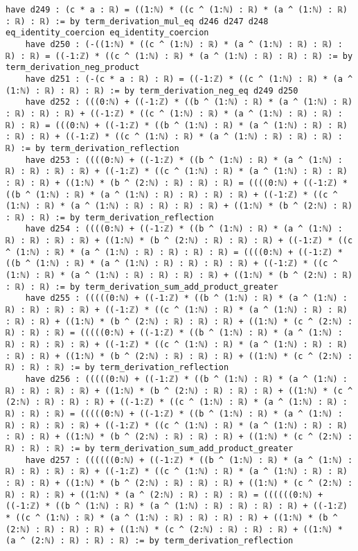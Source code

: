 \documentclass{article}
\begin{document}
\begin{tcolorbox}[colback=white!10, width=\linewidth]
\begin{lstlisting}[language=Lean4]
    have d249 : (c * a : ℝ) = ((1:ℕ) * ((c ^ (1:ℕ) : ℝ) * (a ^ (1:ℕ) : ℝ) : ℝ) : ℝ) := by term_derivation_mul_eq d246 d247 d248 eq_identity_coercion eq_identity_coercion
    have d250 : (-((1:ℕ) * ((c ^ (1:ℕ) : ℝ) * (a ^ (1:ℕ) : ℝ) : ℝ) : ℝ) : ℝ) = ((-1:ℤ) * ((c ^ (1:ℕ) : ℝ) * (a ^ (1:ℕ) : ℝ) : ℝ) : ℝ) := by term_derivation_neg_product
    have d251 : (-(c * a : ℝ) : ℝ) = ((-1:ℤ) * ((c ^ (1:ℕ) : ℝ) * (a ^ (1:ℕ) : ℝ) : ℝ) : ℝ) := by term_derivation_neg_eq d249 d250
    have d252 : (((0:ℕ) + ((-1:ℤ) * ((b ^ (1:ℕ) : ℝ) * (a ^ (1:ℕ) : ℝ) : ℝ) : ℝ) : ℝ) + ((-1:ℤ) * ((c ^ (1:ℕ) : ℝ) * (a ^ (1:ℕ) : ℝ) : ℝ) : ℝ) : ℝ) = (((0:ℕ) + ((-1:ℤ) * ((b ^ (1:ℕ) : ℝ) * (a ^ (1:ℕ) : ℝ) : ℝ) : ℝ) : ℝ) + ((-1:ℤ) * ((c ^ (1:ℕ) : ℝ) * (a ^ (1:ℕ) : ℝ) : ℝ) : ℝ) : ℝ) := by term_derivation_reflection
    have d253 : ((((0:ℕ) + ((-1:ℤ) * ((b ^ (1:ℕ) : ℝ) * (a ^ (1:ℕ) : ℝ) : ℝ) : ℝ) : ℝ) + ((-1:ℤ) * ((c ^ (1:ℕ) : ℝ) * (a ^ (1:ℕ) : ℝ) : ℝ) : ℝ) : ℝ) + ((1:ℕ) * (b ^ (2:ℕ) : ℝ) : ℝ) : ℝ) = ((((0:ℕ) + ((-1:ℤ) * ((b ^ (1:ℕ) : ℝ) * (a ^ (1:ℕ) : ℝ) : ℝ) : ℝ) : ℝ) + ((-1:ℤ) * ((c ^ (1:ℕ) : ℝ) * (a ^ (1:ℕ) : ℝ) : ℝ) : ℝ) : ℝ) + ((1:ℕ) * (b ^ (2:ℕ) : ℝ) : ℝ) : ℝ) := by term_derivation_reflection
    have d254 : ((((0:ℕ) + ((-1:ℤ) * ((b ^ (1:ℕ) : ℝ) * (a ^ (1:ℕ) : ℝ) : ℝ) : ℝ) : ℝ) + ((1:ℕ) * (b ^ (2:ℕ) : ℝ) : ℝ) : ℝ) + ((-1:ℤ) * ((c ^ (1:ℕ) : ℝ) * (a ^ (1:ℕ) : ℝ) : ℝ) : ℝ) : ℝ) = ((((0:ℕ) + ((-1:ℤ) * ((b ^ (1:ℕ) : ℝ) * (a ^ (1:ℕ) : ℝ) : ℝ) : ℝ) : ℝ) + ((-1:ℤ) * ((c ^ (1:ℕ) : ℝ) * (a ^ (1:ℕ) : ℝ) : ℝ) : ℝ) : ℝ) + ((1:ℕ) * (b ^ (2:ℕ) : ℝ) : ℝ) : ℝ) := by term_derivation_sum_add_product_greater
    have d255 : (((((0:ℕ) + ((-1:ℤ) * ((b ^ (1:ℕ) : ℝ) * (a ^ (1:ℕ) : ℝ) : ℝ) : ℝ) : ℝ) + ((-1:ℤ) * ((c ^ (1:ℕ) : ℝ) * (a ^ (1:ℕ) : ℝ) : ℝ) : ℝ) : ℝ) + ((1:ℕ) * (b ^ (2:ℕ) : ℝ) : ℝ) : ℝ) + ((1:ℕ) * (c ^ (2:ℕ) : ℝ) : ℝ) : ℝ) = (((((0:ℕ) + ((-1:ℤ) * ((b ^ (1:ℕ) : ℝ) * (a ^ (1:ℕ) : ℝ) : ℝ) : ℝ) : ℝ) + ((-1:ℤ) * ((c ^ (1:ℕ) : ℝ) * (a ^ (1:ℕ) : ℝ) : ℝ) : ℝ) : ℝ) + ((1:ℕ) * (b ^ (2:ℕ) : ℝ) : ℝ) : ℝ) + ((1:ℕ) * (c ^ (2:ℕ) : ℝ) : ℝ) : ℝ) := by term_derivation_reflection
    have d256 : (((((0:ℕ) + ((-1:ℤ) * ((b ^ (1:ℕ) : ℝ) * (a ^ (1:ℕ) : ℝ) : ℝ) : ℝ) : ℝ) + ((1:ℕ) * (b ^ (2:ℕ) : ℝ) : ℝ) : ℝ) + ((1:ℕ) * (c ^ (2:ℕ) : ℝ) : ℝ) : ℝ) + ((-1:ℤ) * ((c ^ (1:ℕ) : ℝ) * (a ^ (1:ℕ) : ℝ) : ℝ) : ℝ) : ℝ) = (((((0:ℕ) + ((-1:ℤ) * ((b ^ (1:ℕ) : ℝ) * (a ^ (1:ℕ) : ℝ) : ℝ) : ℝ) : ℝ) + ((-1:ℤ) * ((c ^ (1:ℕ) : ℝ) * (a ^ (1:ℕ) : ℝ) : ℝ) : ℝ) : ℝ) + ((1:ℕ) * (b ^ (2:ℕ) : ℝ) : ℝ) : ℝ) + ((1:ℕ) * (c ^ (2:ℕ) : ℝ) : ℝ) : ℝ) := by term_derivation_sum_add_product_greater
    have d257 : ((((((0:ℕ) + ((-1:ℤ) * ((b ^ (1:ℕ) : ℝ) * (a ^ (1:ℕ) : ℝ) : ℝ) : ℝ) : ℝ) + ((-1:ℤ) * ((c ^ (1:ℕ) : ℝ) * (a ^ (1:ℕ) : ℝ) : ℝ) : ℝ) : ℝ) + ((1:ℕ) * (b ^ (2:ℕ) : ℝ) : ℝ) : ℝ) + ((1:ℕ) * (c ^ (2:ℕ) : ℝ) : ℝ) : ℝ) + ((1:ℕ) * (a ^ (2:ℕ) : ℝ) : ℝ) : ℝ) = ((((((0:ℕ) + ((-1:ℤ) * ((b ^ (1:ℕ) : ℝ) * (a ^ (1:ℕ) : ℝ) : ℝ) : ℝ) : ℝ) + ((-1:ℤ) * ((c ^ (1:ℕ) : ℝ) * (a ^ (1:ℕ) : ℝ) : ℝ) : ℝ) : ℝ) + ((1:ℕ) * (b ^ (2:ℕ) : ℝ) : ℝ) : ℝ) + ((1:ℕ) * (c ^ (2:ℕ) : ℝ) : ℝ) : ℝ) + ((1:ℕ) * (a ^ (2:ℕ) : ℝ) : ℝ) : ℝ) := by term_derivation_reflection

\end{lstlisting}
\end{tcolorbox}
\end{document}
